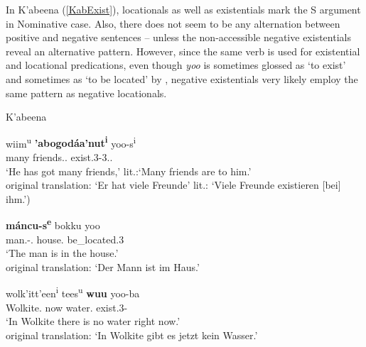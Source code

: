 

In K'abeena (\ref{KabExist}), locationals as well as existentials  mark the S argument in Nominative case.
Also, there does not seem to be any alternation between positive and negative sentences -- unless the non-accessible negative existentials reveal an alternative pattern. 
However, since the same verb is used for existential and locational predications, even though \emph{yoo} is sometimes glossed as `to exist' and sometimes as `to be located' by \citet{Crass:2005}, negative existentials very likely employ the same pattern as negative locationals. 
 
\pagebreak
\begin{exe}\ex\label{KabExist} {K'abeena} \citep [Eastern Cushitic; Ethiopia; ][98, 115, 98]{Crass:2005}\nopagebreak[4]
\begin{xlist}
\ex\gll wiim\textsuperscript{u} \textbf{'abogod\'aa'nut\textsuperscript{i}} yoo-s\textsuperscript{i}\\
many friends.\nom{}.\pl{} exist.3-3\sg{}.\mas{}.\obj{}\\
\glt `He has got many friends,' lit.:`Many friends are to him.'\\ 
original translation: `Er hat viele Freunde' lit.: `Viele Freunde exis\-tie\-ren [bei] ihm.')

\ex\gll \textbf{m\'ancu-s\textsuperscript{e}} bokku yoo\\
man.\nom{}-.\mas{} house.\acc{} be\_located.3\\
\glt `The man is in the house.' \\
original translation: `Der Mann ist im Haus.'

\ex\gll wolk'itt'een\textsuperscript{i} tees\textsuperscript{u} \textbf{wuu} yoo-ba\\
Wolkite.\loc{} now water.\nom{} exist.3-\Neg{}\\
\glt `In Wolkite there is no water right now.'\\ 
original translation: `In Wolkite gibt es jetzt kein Wasser.'
\end{xlist}
\end{exe}

